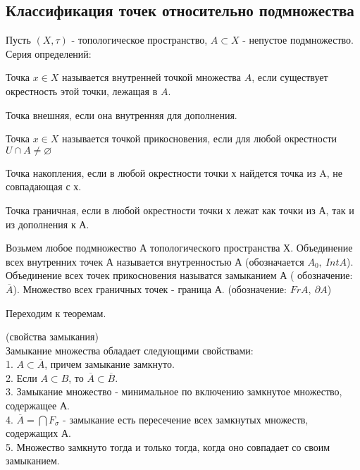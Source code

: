 \subsection{Классификация точек относительно подмножества}
Пусть $(X,\tau)$ - топологическое пространство, $A\subset X$ - непустое 
подмножество. Серия определений:
\begin{defin}
Точка $x\in X$ называется внутренней точкой множества  $A$, если существует
окрестность этой точки, лежащая в $A$.
\end{defin}
\begin{defin}
Точка внешняя, если она внутренняя для дополнения.
\end{defin}
\begin{defin}
Точка $x\in X$ называется точкой прикосновения, если для любой окрестности
 $U\cap A\ne\varnothing$
\end{defin}
\begin{defin}
Точка накопления, если в любой окрестности точки х найдется точка из A, не
совпадающая с х.
\end{defin}
\begin{defin}
Точка граничная, если в любой окрестности точки х лежат как точки из А,
так и из дополнения к А. 
\end{defin}
\begin{defin}
 Возьмем любое подмножество А топологического пространства Х. Объединение
 всех внутренних точек А называется внутренностью А (обозначается $A_0,~
 Int A$). Объединение всех точек прикосновения называтся замыканием А (
 обозначение: $\overline{A}$). Множество всех граничных точек - граница А. 
 (обозначение: $FrA,~\partial A$)
\end{defin}
Переходим к теоремам. 
\begin{theor}
 (свойства замыкания)\\
 Замыкание множества обладает следующими свойствами:\\
 1. $A\subset \overline{A}$, причем замыкание замкнуто.\\
 2. Если $A\subset B$, то $\overline{A}\subset \overline{B}$.\\
 3. Замыкание множество - минимальное по включению замкнутое множество, 
 содержащее А.\\
 4. $\overline{A}=\bigcap F_\sigma$ - замыкание есть пересечение всех 
 замкнутых множеств, содержащих А.\\
 5. Множество замкнуто тогда и только тогда, когда оно совпадает со своим
 замыканием.
\end{theor}
